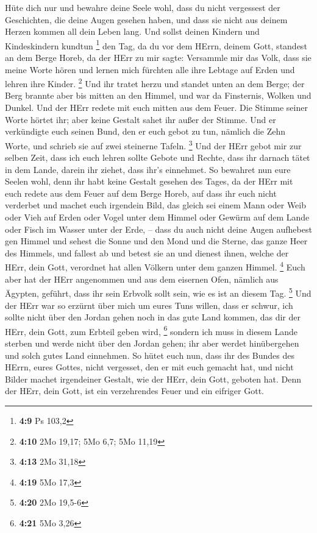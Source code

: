  Hüte dich nur und bewahre deine Seele wohl, dass du nicht
vergessest der Geschichten, die deine Augen gesehen haben, und dass sie
nicht aus deinem Herzen kommen all dein Leben lang. Und sollst deinen
Kindern und Kindeskindern kundtun \footnote{\textbf{4:9} Ps 103,2}
 den Tag, da du vor dem HErrn, deinem Gott, standest an
dem Berge Horeb, da der HErr zu mir sagte: Versammle mir das Volk, dass
sie meine Worte hören und lernen mich fürchten alle ihre Lebtage auf
Erden und lehren ihre Kinder. \footnote{\textbf{4:10} 2Mo 19,17; 5Mo
  6,7; 5Mo 11,19}  Und ihr tratet herzu und standet unten
an dem Berge; der Berg brannte aber bis mitten an den Himmel, und war da
Finsternis, Wolken und Dunkel.  Und der HErr redete mit
euch mitten aus dem Feuer. Die Stimme seiner Worte hörtet ihr; aber
keine Gestalt sahet ihr außer der Stimme.  Und er
verkündigte euch seinen Bund, den er euch gebot zu tun, nämlich die Zehn
Worte, und schrieb sie auf zwei steinerne Tafeln. \footnote{\textbf{4:13}
  2Mo 31,18}  Und der HErr gebot mir zur selben Zeit,
dass ich euch lehren sollte Gebote und Rechte, dass ihr darnach tätet in
dem Lande, darein ihr ziehet, dass ihr's einnehmet.  So
bewahret nun eure Seelen wohl, denn ihr habt keine Gestalt gesehen des
Tages, da der HErr mit euch redete aus dem Feuer auf dem Berge Horeb,
 auf dass ihr euch nicht verderbet und machet euch
irgendein Bild, das gleich sei einem Mann oder Weib  oder
Vieh auf Erden oder Vogel unter dem Himmel  oder Gewürm
auf dem Lande oder Fisch im Wasser unter der Erde, -- 
dass du auch nicht deine Augen aufhebest gen Himmel und sehest die Sonne
und den Mond und die Sterne, das ganze Heer des Himmels, und fallest ab
und betest sie an und dienest ihnen, welche der HErr, dein Gott,
verordnet hat allen Völkern unter dem ganzen Himmel. \footnote{\textbf{4:19}
  5Mo 17,3}  Euch aber hat der HErr angenommen und aus
dem eisernen Ofen, nämlich aus Ägypten, geführt, dass ihr sein Erbvolk
sollt sein, wie es ist an diesem Tag. \footnote{\textbf{4:20} 2Mo 19,5-6}
 Und der HErr war so erzürnt über mich um eures Tuns
willen, dass er schwur, ich sollte nicht über den Jordan gehen noch in
das gute Land kommen, das dir der HErr, dein Gott, zum Erbteil geben
wird, \footnote{\textbf{4:21} 5Mo 3,26}  sondern ich muss
in diesem Lande sterben und werde nicht über den Jordan gehen; ihr aber
werdet hinübergehen und solch gutes Land einnehmen.  So
hütet euch nun, dass ihr des Bundes des HErrn, eures Gottes, nicht
vergesset, den er mit euch gemacht hat, und nicht Bilder machet
irgendeiner Gestalt, wie der HErr, dein Gott, geboten hat.
 Denn der HErr, dein Gott, ist ein verzehrendes Feuer und
ein eifriger Gott.

